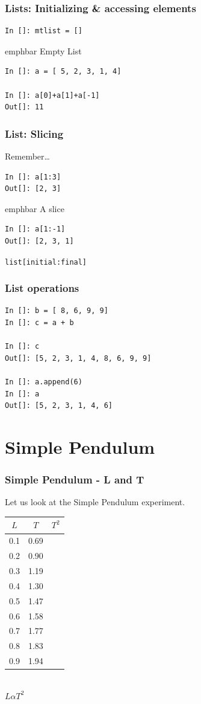 \documentclass[14pt,compress]{beamer}
\newcommand{\emphbar}[1]
{\begin{beamercolorbox}[rounded=true]{emphbar} 
      {#1}
 \end{beamercolorbox}
}
\newcounter{time}
\newcommand{\inctime}[1]{\addtocounter{time}{#1}{\tiny \thetime\ m}}
\newcommand{\typ}[1]{\lstinline{#1}}
\newcommand{\kwrd}[1]{ \texttt{\textbf{\color{blue}{#1}}}  }
\begin{document}
\begin{frame}[fragile]
\frametitle{Lists: Initializing \& accessing elements}
\begin{lstlisting}
In []: mtlist = [] 
\end{lstlisting}
\emphbar{Empty List}
\begin{lstlisting}
In []: a = [ 5, 2, 3, 1, 4] 

In []: a[0]+a[1]+a[-1]
Out[]: 11
\end{lstlisting}
\end{frame}

\begin{frame}[fragile]
  \frametitle{List: Slicing}
  \begin{block}{Remember\ldots}
	\kwrd{In []: a = [ 5, 2, 3, 1, 4]}
  \end{block}
\begin{lstlisting}
In []: a[1:3]
Out[]: [2, 3]
\end{lstlisting}
\emphbar{A slice}
\begin{lstlisting}
In []: a[1:-1]
Out[]: [2, 3, 1]
\end{lstlisting}
\alert{\typ{list[initial:final]}}
\end{frame}

\begin{frame}[fragile]
\frametitle{List operations}
\begin{lstlisting}
In []: b = [ 8, 6, 9, 9]
In []: c = a + b

In []: c
Out[]: [5, 2, 3, 1, 4, 8, 6, 9, 9]

In []: a.append(6)
In []: a
Out[]: [5, 2, 3, 1, 4, 6]
\end{lstlisting}
\end{frame}

\section{Simple Pendulum}
\begin{frame}[fragile]
\frametitle{Simple Pendulum - L and T}
Let us look at the Simple Pendulum experiment.
\begin{center}
\begin{small}
\begin{tabular}{| c | c | c |}
\hline
$L$ & $T$ & $T^2$ \\ \hline
0.1 & 0.69 & \\ \hline
0.2 & 0.90 & \\ \hline
0.3 & 1.19 & \\ \hline
0.4 & 1.30 & \\ \hline
0.5 & 1.47 & \\ \hline
0.6 & 1.58 & \\ \hline
0.7 & 1.77 & \\ \hline
0.8 & 1.83 & \\ \hline
0.9 & 1.94 & \\ \hline
\end{tabular}
\end{small}\\
\alert{$L \alpha T^2$}
\end{center}
\end{frame}
\end{document}
